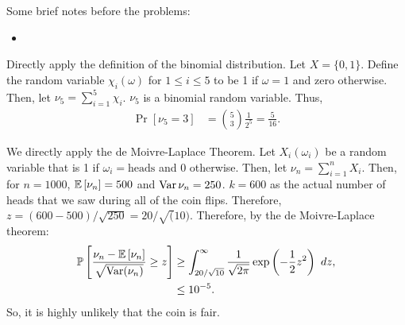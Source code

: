 Some brief notes before the problems:
\begin{itemize}
    \item \color{brickred}{Koralov and Sinai use $\times$ instead of $\otimes$ for the product $\sigma$-algebra. Moving forward, the reader needs to be cautious about what the operands are. For if they are $\sigma$-algebras, we understand the result of the expression to be the aforementioned product.} 
\end{itemize}
\begin{problem}{1}
\end{problem}
\begin{solution}
    Directly apply the definition of the binomial distribution. Let $X = \{0,1\}$. Define the random variable $\chi_i(\omega)$ for $1\leq i\leq 5$ to be 1 if $\omega = 1$ and zero otherwise. Then, let $\nu_5 = \sum_{i=1}^5 \chi_i$. $\nu_5$ is a binomial random variable. Thus,
    \begin{align*}
        \Pr[\nu_5 = 3] &= \binom{5}{3} \frac{1}{2^5} = \frac{5}{16}.
    \end{align*}
\end{solution}
\begin{problem}{2}
\end{problem}
\begin{solution}
    
\end{solution}
\begin{problem}{3}
\end{problem}
\begin{solution}
    We directly apply the de Moivre-Laplace Theorem. Let $X_i(\omega_i)$ be a random variable that is 1 if $\omega_i =\text{heads}$ and 0 otherwise. Then, let $\nu_n = \sum_{i=1}^n X_i$. Then, for $n=1000$, $\mathbb{E}\left[\nu_n\right] = 500$ and $\operatorname{Var}{\nu_n} = 250$. $k=600$ as the actual number of heads that we saw during all of the coin flips. Therefore, 
    $z = (600 - 500) / \sqrt{250} = 20/\sqrt(10)$. Therefore, by the de Moivre-Laplace theorem:
    \begin{align*}
        \mathbb{P}\left[\frac{\nu_n - \mathbb{E}\left[\nu_n\right]}{\sqrt{\operatorname{Var}(\nu_n)}} \geq z\right] &\geq \int_{20/\sqrt{10}}^\infty \frac{1}{\sqrt{2\pi}}\exp\left(-\frac{1}{2}z^2\right)~dz, \\
        &\leq 10^{-5}.
    \end{align*}
    So, it is highly unlikely that the coin is fair.
\end{solution}
\begin{problem}{4}
    
\end{problem}
